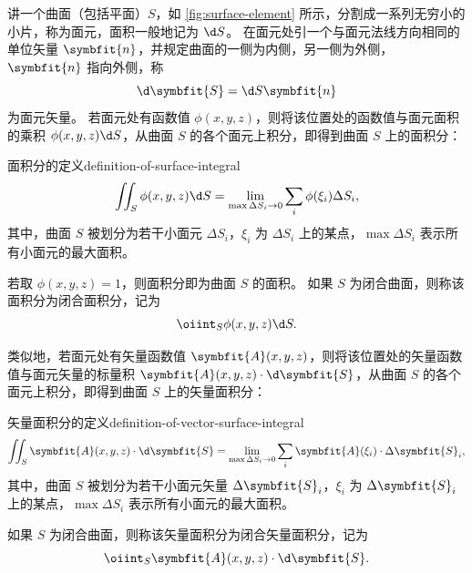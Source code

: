 \bigskip


讲一个曲面（包括平面）$ S $，如 \cref{fig:surface-element} 所示，分割成一系列无穷小的小片，称为面元，面积一般地记为 $ \d S $。
在面元处引一个与面元法线方向相同的单位矢量 $ \symbfit{n} $，并规定曲面的一侧为内侧，另一侧为外侧，$ \symbfit{n} $ 指向外侧，称
\begin{equation*}
    \d \symbfit{S} = \d S \symbfit{n}
\end{equation*}
为面元矢量。
若面元处有函数值 $ \phi (x, y, z) $，则将该位置处的函数值与面元面积的乘积 $ \phi (x, y, z) \d S $，从曲面 $ S $ 的各个面元上积分，即得到曲面 $ S $ 上的面积分：
\begin{definition}{面积分的定义}{definition-of-surface-integral}
    \begin{equation}
        \iint_S \phi (x, y, z) \d S = \lim_{\max \Delta S_i \to 0} \sum_{i} \phi (\xi_i) \Delta S_i ,
    \end{equation}
    其中，曲面 $ S $ 被划分为若干小面元 $ \Delta S_i $，$ \xi_i $ 为 $ \Delta S_i $ 上的某点，$ \max \Delta S_i $ 表示所有小面元的最大面积。
\end{definition}

若取 $ \phi (x, y, z) = 1 $，则面积分即为曲面 $ S $ 的面积。
如果 $ S $ 为闭合曲面，则称该面积分为闭合面积分，记为
\begin{equation}
    \oiint_S \phi (x, y, z) \d S .
\end{equation}

\bigskip

类似地，若面元处有矢量函数值 $ \symbfit{A} (x, y, z) $，则将该位置处的矢量函数值与面元矢量的标量积 $ \symbfit{A} (x, y, z) \cdot \d \symbfit{S} $，从曲面 $ S $ 的各个面元上积分，即得到曲面 $ S $ 上的矢量面积分：
\begin{definition}{矢量面积分的定义}{definition-of-vector-surface-integral}
    \begin{equation}
        \iint_S \symbfit{A} (x, y, z) \cdot \d \symbfit{S} = \lim_{\max \Delta S_i \to 0} \sum_{i} \symbfit{A} (\xi_i) \cdot \Delta \symbfit{S}_i ,
    \end{equation}
    其中，曲面 $ S $ 被划分为若干小面元矢量 $ \Delta \symbfit{S}_i $，$ \xi_i $ 为 $ \Delta \symbfit{S}_i $ 上的某点，$ \max \Delta S_i $ 表示所有小面元的最大面积。
\end{definition}

如果 $ S $ 为闭合曲面，则称该矢量面积分为闭合矢量面积分，记为
\begin{equation}
    \oiint_S \symbfit{A} (x, y, z) \cdot \d \symbfit{S} .
\end{equation}


